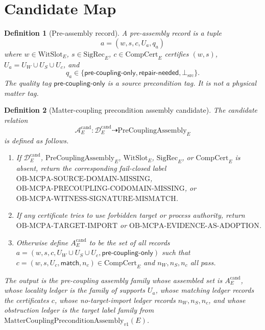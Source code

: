 \documentclass[11pt]{article}
\newcommand{\MCPA}{\mathrm{MatterCouplingPreconditionAssembly}_{v1}}
\newcommand{\PreCoupAsm}{\mathrm{PreCouplingAssembly}}
\newcommand{\WitSlot}{\mathrm{WitSlot}}
\newcommand{\SigRec}{\mathrm{SigRec}}
\newcommand{\CompCert}{\mathrm{CompCert}}
\newcommand{\BottomSrc}{\bot_{\mathrm{src}}}
\newtheorem{definition}{Definition}
\begin{document}
\section{Candidate Map}

\begin{definition}[Pre-assembly record]
A pre-assembly record is a tuple
\[
  a=(w,s,c,U_a,q_a)
\]
where \(w\in\WitSlot_E\), \(s\in\SigRec_E\), \(c\in\CompCert_E\) certifies
\((w,s)\), \(U_a=U_W\cup U_S\cup U_c\), and
\[
  q_a\in
  \{\mathsf{pre\text{-}coupling\text{-}only},
    \mathsf{repair\text{-}needed},
    \BottomSrc\}.
\]
The quality tag \(\mathsf{pre\text{-}coupling\text{-}only}\) is a source
precondition tag. It is not a physical matter tag.
\end{definition}

\begin{definition}[Matter-coupling precondition assembly candidate]
The candidate relation
\[
  \mathcal{A}^{\mathrm{cand}}_E:
  \mathcal{D}^{\mathrm{cand}}_E \dashrightarrow \PreCoupAsm_E
\]
is defined as follows.

\begin{enumerate}[label=\textup{(\alph*)}]
  \item If \(\mathcal{D}^{\mathrm{cand}}_E\), \(\PreCoupAsm_E\),
  \(\WitSlot_E\), \(\SigRec_E\), or \(\CompCert_E\) is absent, return the
  corresponding fail-closed label
  \(\mathrm{OB\text{-}MCPA\text{-}SOURCE\text{-}DOMAIN\text{-}MISSING}\),
  \(\mathrm{OB\text{-}MCPA\text{-}PRECOUPLING\text{-}CODOMAIN\text{-}MISSING}\),
  or
  \(\mathrm{OB\text{-}MCPA\text{-}WITNESS\text{-}SIGNATURE\text{-}MISMATCH}\).
  \item If any certificate tries to use forbidden target or process authority,
  return \(\mathrm{OB\text{-}MCPA\text{-}TARGET\text{-}IMPORT}\) or
  \(\mathrm{OB\text{-}MCPA\text{-}EVIDENCE\text{-}AS\text{-}ADOPTION}\).
  \item Otherwise define \(A_E^{\mathrm{cand}}\) to be the set of all
  records \(a=(w,s,c,U_W\cup U_S\cup U_c,
  \mathsf{pre\text{-}coupling\text{-}only})\) such that
  \(c=(w,s,U_c,\mathsf{match},n_c)\in\CompCert_E\) and
  \(n_W,n_S,n_c\) all pass.
\end{enumerate}

The output is the pre-coupling assembly family whose assembled set is
\(A_E^{\mathrm{cand}}\), whose locality ledger is the family of supports
\(U_a\), whose matching ledger records the certificates \(c\), whose
no-target-import ledger records \(n_W,n_S,n_c\), and whose obstruction ledger
is the target label family from \(\MCPA(E)\).
\end{definition}
\end{document}
